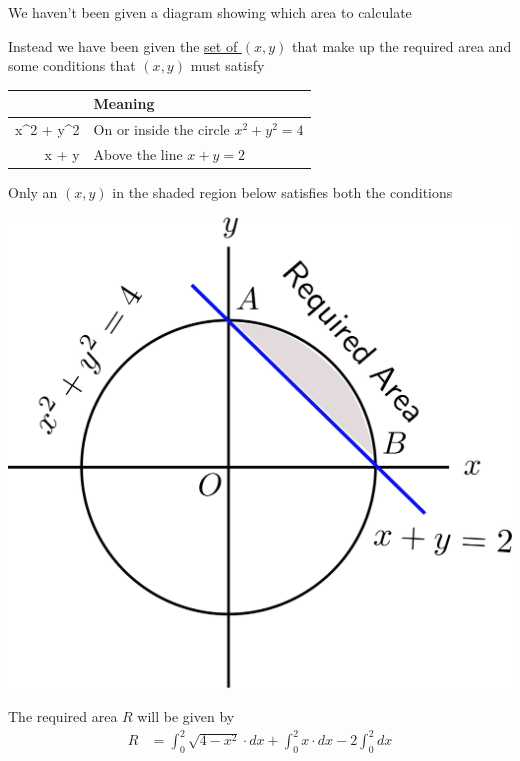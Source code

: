 \documentclass[14pt,fleqn]{extarticle}
\begin{document}
\newcard

We haven't been given a diagram showing which area to calculate\newline 

Instead we have been given the \underline{set of $(x,y)$} that make up the required area and some conditions that $(x,y)$ must satisfy 

\begin{center}
  \begin{tabular}{Nl}
  \toprule 
         & Meaning \\
   \midrule 
     x^2 + y^2  &  On or inside the circle $x^2+y^2 = 4$ \\
    \midrule 
    x + y  & Above the line $x+y = 2$ \\
    \bottomrule
  \end{tabular}
\end{center}

Only an $(x,y)$ in the shaded region below satisfies both the conditions 

\begin{center}
\includegraphics[scale=0.35]{right.svg}
\end{center}
%

\newcard

The required area $R$ will be given by 
\begin{align}
R &= \int_0^2 \sqrt{4-x^2}\cdot dx + \int_0^2 x\cdot dx - 2\int_0^2 dx
\end{align} 
\end{document}
